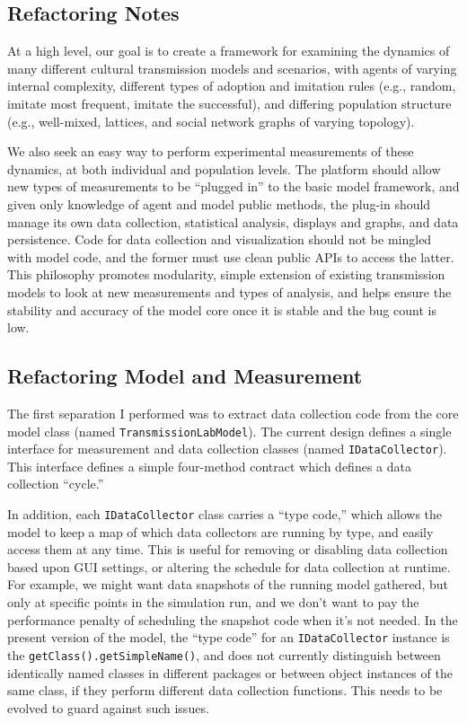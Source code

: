 \documentclass{kluwer-mem-copyright}
\begin{document}
\begin{article}
\section{Refactoring Notes}
At a high level, our goal is to create a framework for examining the dynamics of
many different cultural transmission models and scenarios, with agents of
varying internal complexity, different types of adoption and imitation rules
(e.g., random, imitate most frequent, imitate the successful), and differing
population structure (e.g., well-mixed, lattices, and social network graphs of
varying topology).  

We also seek an easy way to perform experimental measurements of these dynamics,
at both individual and population levels.  The platform should allow new types
of measurements to be ``plugged in'' to the basic model framework, and given
only knowledge of agent and model public methods, the plug-in should manage its
own data collection, statistical analysis, displays and graphs, and data
persistence.  Code for data collection and visualization should not be mingled
with model code, and the former must use clean public APIs to access the latter.
This philosophy promotes modularity, simple extension of existing transmission
models to look at new measurements and types of analysis, and helps ensure the
stability and accuracy of the model core once it is stable and the bug count is
low. 
\subsection{Refactoring Model and Measurement}
The first separation I performed was to extract data collection code from
the core model class (named \texttt{TransmissionLabModel}).  The current design
defines a single interface for measurement and data collection classes (named
\texttt{IDataCollector}).  This interface defines a simple four-method contract
which defines a data collection ``cycle.''  

In addition, each \texttt{IDataCollector} class carries a ``type code,'' which
allows the model to keep a map of which data collectors are running by type, and
easily access them at any time.  This is useful for removing or disabling data
collection based upon GUI settings, or altering the schedule for data collection
at runtime.  For example, we might want data snapshots of the running model
gathered, but only at specific points in the simulation run, and we don't want
to pay the performance penalty of scheduling the snapshot code when it's not
needed.  In the present version of the model, the ``type code'' for an
\texttt{IDataCollector} instance is the \texttt{getClass().getSimpleName()}, and
does not currently distinguish between identically named classes in different
packages or between object instances of the same class, if they perform
different data collection functions.  This needs to be evolved to guard against
such issues.


\end{article}
\end{document}
